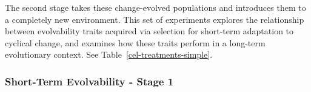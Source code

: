 \documentclass[10pt,letterpaper]{article}
\begin{document}
The second stage takes these change-evolved populations and introduces them to a completely new environment. This set of experiments explores the relationship between evolvability traits acquired via selection for short-term adaptation to cyclical change, and examines how these traits perform in a long-term evolutionary context. See Table~\ref{cel-treatments-simple}.








\subsubsection*{Short-Term Evolvability - Stage 1%
}
\end{document}
